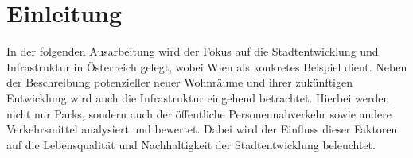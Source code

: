 \section{Einleitung}

In der folgenden Ausarbeitung wird der Fokus auf die Stadtentwicklung und Infrastruktur in Österreich gelegt, wobei Wien als konkretes Beispiel dient. Neben der Beschreibung potenzieller neuer Wohnräume und ihrer zukünftigen Entwicklung wird auch die Infrastruktur eingehend betrachtet. Hierbei werden nicht nur Parks, sondern auch der öffentliche Personennahverkehr sowie andere Verkehrsmittel analysiert und bewertet. Dabei wird der Einfluss dieser Faktoren auf die Lebensqualität und Nachhaltigkeit der Stadtentwicklung beleuchtet.